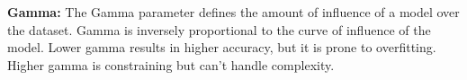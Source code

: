 \vspace{-1em}
\textbf{Gamma:} The Gamma parameter defines the amount of influence of a model over the dataset. Gamma is inversely proportional to the curve of influence of the model. Lower gamma results in higher accuracy, but it is prone to overfitting. Higher gamma is constraining but can't handle complexity.

